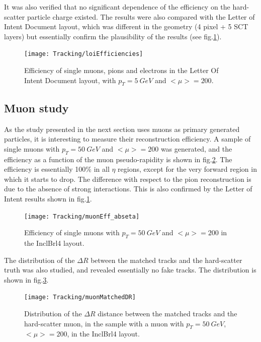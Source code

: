 \documentclass[a4paper,twoside,12pt]{article}
\begin{document}
\clearpage

It was also verified that no significant dependence of the efficiency on the hard-scatter particle charge existed. The results were also compared with
the Letter of Intent Document\cite{loi} layout, which was different in the geometry (4 pixel + 5 SCT layers) but essentially confirm the plausibility of the results (see fig.\ref{fig:tracking:loiEfficiencies}).

\begin{figure}
\centering
\texttt{[image: Tracking/loiEfficiencies]}
\caption{Efficiency of single muons, pions and electrons in the Letter Of Intent Document\cite{loi} layout, with $p_{T} = 5\ GeV$ and $<\mu> = 200$.}
\label{fig:tracking:loiEfficiencies}
\end{figure} 


\subsection{Muon study}
As the study presented
in the next section uses muons as primary generated particles, it is interesting to measure their reconstruction efficiency. A sample of 
single muons with $p_{T} = 50\ GeV$ and $<\mu> = 200$ was generated, and the efficiency as a function of the muon pseudo-rapidity is
shown in fig.\ref{fig:tracking:muonEff_abseta}. The efficiency is essentially 100\% in all $\eta$ regions, except for the very forward region in which it starts to drop.
The difference with respect to the pion reconstruction is due to the absence of strong interactions. This is also confirmed by the Letter of Intent\cite{loi} results shown in fig.\ref{fig:tracking:loiEfficiencies}.\\

\begin{figure}
\centering
\texttt{[image: Tracking/muonEff\_abseta]}
\caption{Efficiency of single muons with $p_{T} = 50\ GeV$ and $<\mu> = 200$ in the InclBrl4 layout.}
\label{fig:tracking:muonEff_abseta}
\end{figure} 

The distribution of the $\Delta R$ between the matched tracks and the hard-scatter truth was also studied, and revealed essentially no fake tracks. The distribution is
shown in fig.\ref{fig:tracking:muonMatchedDR}.

\begin{figure}
\centering
\texttt{[image: Tracking/muonMatchedDR]}
\caption{Distribution of the $\Delta R$ distance between the matched tracks and the hard-scatter muon, in the sample with a muon with $p_{T} = 50\ GeV$, $<\mu> = 200$, in the InclBrl4 layout.}
\label{fig:tracking:muonMatchedDR}
\end{figure} 
\end{document}
